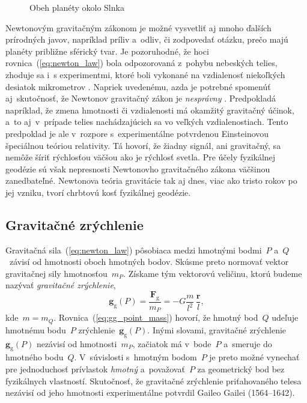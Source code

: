 \documentclass[a4paper,12pt]{book}
\newcommand{\gidx}{\mathrm g}
\let\vec\mathbf
\begin{document}
\begin{figure}
\centering

\caption{Obeh planéty okolo Slnka}
\label{fig:orbital_motion}
\end{figure}

Newtonovým gravitačným zákonom je možné vysvetliť aj mnoho ďalších prírodných 
javov, napríklad príliv a~odliv, či zodpovedať otázku, prečo majú planéty 
približne sférický tvar.  Je pozoruhodné, že hoci rovnica~(\ref{eq:newton_law}) 
bola odpozorovaná z~pohybu nebeských telies, zhoduje sa i~s experimentmi, ktoré 
boli vykonané na vzdialenosť niekoľkých desiatok mikrometrov 
\parencite{Lee2020}.  Napriek uvedenému, azda je potrebné spomenúť 
aj~skutočnosť, že Newtonov gravitačný zákon je \emph{nesprávny} 
\parencite{Feynman}.  Predpokladá napríklad, že zmena hmotnosti či vzdialenosti 
má okamžitý gravitačný účinok, a~to aj~v~prípade telies nachádzajúcich sa vo 
veľkých vzdialenostiach.  Tento predpoklad je ale v~rozpore s~experimentálne 
potvrdenou Einsteinovou špeciálnou teóriou relativity.  Tá hovorí, že žiadny 
signál, ani gravitačný, sa nemôže šíriť rýchlosťou väčšou ako je rýchlosť 
svetla.  Pre účely fyzikálnej geodézie sú však nepresnosti Newtonovho 
gravitačného zákona väčšinou zanedbateľné.  Newtonova teória gravitácie tak aj 
dnes, viac ako tristo rokov po jej vzniku, tvorí chrbtovú kosť fyzikálnej 
geodézie.






\subsection{Gravitačné zrýchlenie}
\label{sec:gg}

Gravitačná sila~(\ref{eq:newton_law}) pôsobiaca medzi hmotnými bodmi~$P$ 
a~$Q$~závisí od hmotnosti oboch hmotných bodov.  Skúsme preto normovať vektor 
gravitačnej sily hmotnosťou~$m_P$.  Získame tým vektorovú veličinu, ktorú 
budeme nazývať \emph{gravitačné zrýchlenie},
%
\begin{equation}
\label{eq:gg_point_mass}
\vec g_\gidx(P) = \frac{\vec F_\gidx}{m_P} = -G \frac{m}{l^2} \, \frac{\vec
r}{l}{,}
\end{equation}
%
kde~$m = m_Q$.  Rovnica~(\ref{eq:gg_point_mass}) hovorí, že hmotný
bod~$Q$ udeľuje hmotnému bodu~$P$ zrýchlenie~$\vec g_\gidx(P)$.   Inými
slovami, gravitačné zrýchlenie~$\vec g_\gidx(P)$ nezávisí od hmotnosti~$m_P$, 
začiatok má v~bode~$P$ a~smeruje do hmotného bodu~$Q$.  V~súvislosti
s~hmotným bodom~$P$ je preto možné vynechať pre jednoduchosť prívlastok
\emph{hmotný} a~považovať~$P$ za geometrický bod bez fyzikálnych vlastností.
Skutočnosť, že gravitačné zrýchlenie priťahovaného telesa nezávisí od jeho
hmotnosti experimentálne potvrdil Gaileo Gailei (1564--1642).
\end{document}
